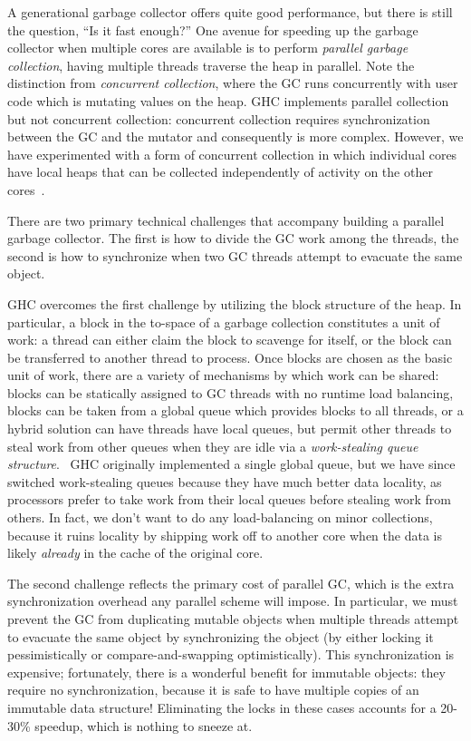 
A generational garbage collector offers quite good performance, but
there is still the question, ``Is it fast enough?''  One avenue for
speeding up the garbage collector when multiple cores are available is
to perform \emph{parallel garbage collection}, having multiple threads
traverse the heap in parallel.  Note the distinction from
\emph{concurrent collection}, where the GC runs concurrently with user
code which is mutating values on the heap.  GHC implements parallel
collection~\cite{Marlow:2008:PGG:1375634.1375637} but not concurrent
collection: concurrent collection requires synchronization between the
GC and the mutator and consequently is more complex.  However, we have
experimented with a form of concurrent collection in which individual
cores have local heaps that can be collected independently of activity
on the other cores~\cite{local-heaps}.

There are two primary technical challenges that accompany building a
parallel garbage collector.  The first is how to divide the GC work
among the threads, the second is how to synchronize when two GC threads
attempt to evacuate the same object.

GHC overcomes the first challenge by utilizing the block structure of
the heap.  In particular, a block in the to-space of a garbage
collection constitutes a unit of work: a thread can either claim the
block to scavenge for itself, or the block can be transferred to another
thread to process.  Once blocks are chosen as the basic unit of work,
there are a variety of mechanisms by which work can be shared: blocks
can be statically assigned to GC threads with no runtime load balancing,
blocks can be taken from a global queue which provides blocks to all
threads, or a hybrid solution can have threads have local queues, but
permit other threads to steal work from other queues when they are idle
via a \emph{work-stealing queue
structure}.~\cite{Arora:1998:TSM:277651.277678}  GHC originally
implemented a single global queue, but we have since switched
work-stealing queues because they have much better data locality, as
processors prefer to take work from their local queues before stealing
work from others.  In fact, we don't want to do any load-balancing on
minor collections, because it ruins locality by shipping work off to
another core when the data is likely \emph{already} in the cache of the
original core.~\cite{Marlow2009}

The second challenge reflects the primary cost of parallel GC, which is
the extra synchronization overhead any parallel scheme will impose.  In
particular, we must prevent the GC from duplicating mutable objects when
multiple threads attempt to evacuate the same object by synchronizing
the object (by either locking it pessimistically or compare-and-swapping
optimistically).  This synchronization is expensive; fortunately, there
is a wonderful benefit for immutable objects: they require no
synchronization, because it is safe to have multiple copies of an
immutable data structure!  Eliminating the locks in these cases accounts
for a 20-30\% speedup, which is nothing to sneeze at.

